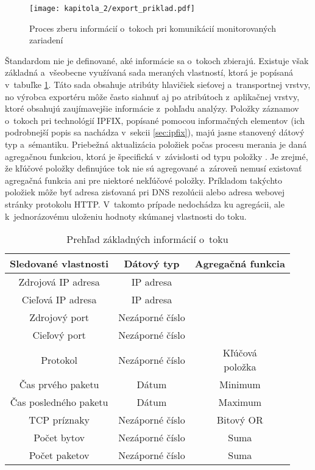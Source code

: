 \begin{figure*}[ht]
    \centering
    \texttt{[image: kapitola\_2/export\_priklad.pdf]}
    \caption{Proces zberu informácií o~tokoch pri komunikácií monitorovaných zariadení}
    \label{meranie_a_export}
\end{figure*}

Štandardom nie je definované, aké informácie sa o~tokoch zbierajú. Existuje však základná a~všeobecne využívaná sada meraných vlastností, ktorá je popísaná v~tabuľke \ref{tab_vlastnosti_tokov}. Táto sada obsahuje atribúty hlavičiek sieťovej a~transportnej vrstvy,
no výrobca exportéru môže často siahnuť aj po atribútoch z~aplikačnej vrstvy, ktoré obsahujú zaujímavejšie informácie z~pohľadu analýzy. Položky záznamov o~tokoch pri technológií IPFIX, popísané pomocou informačných elementov (ich podrobnejší popis sa nachádza v~sekcii
\ref{sec:ipfix}), majú jasne stanovený dátový typ a~sémantiku. Priebežná aktualizácia položiek počas procesu merania je daná agregačnou funkciou, ktorá je špecifická v~závislosti od typu položky \cite{rfc7012}. Je zrejmé, že kľúčové položky definujúce tok nie sú agregované
a~zároveň nemusí existovať agregačná funkcia ani pre niektoré nekľúčové položky. Príkladom takýchto položiek môže byť adresa zisťovaná pri DNS rezolúcii alebo adresa webovej stránky protokolu HTTP. V~takomto prípade nedochádza ku agregácii, ale k~jednorázovému uloženiu
hodnoty skúmanej vlastnosti do toku.

\begin{table}[ht]
    \centering
    \begin{tabular}{ccc}
        \label{tab_vlastnosti_tokov}
        \\ \hline \addlinespace[2pt]
        Sledované vlastnosti & Dátový typ & Agregačná funkcia \\ \hline \addlinespace[1pt]
        \rowcolor{silver} Zdrojová IP adresa & IP adresa & \cellcolor{silver}\\
        \rowcolor{silver} Cieľová IP adresa & IP adresa & \cellcolor{silver}\\
        \rowcolor{silver} Zdrojový port & Nezáporné číslo & \cellcolor{silver}\\
        \rowcolor{silver} Cieľový port & Nezáporné číslo & \cellcolor{silver} \\
        \rowcolor{silver} Protokol & Nezáporné číslo & \multirow{-5}{*}{\cellcolor{silver}\parbox{1.3cm}{Kľúčová \\položka}} \\ \addlinespace[2pt]
        Čas prvého paketu & Dátum & Minimum\\
        Čas posledného paketu & Dátum & Maximum \\
        TCP príznaky & Nezáporné číslo & Bitový OR\\
        Počet bytov & Nezáporné číslo & Suma \\
        Počet paketov & Nezáporné číslo & Suma \\ \bottomrule
    \end{tabular}
    \caption{Prehľad základných informácií o~toku \cite{hutak}}
\end{table}


